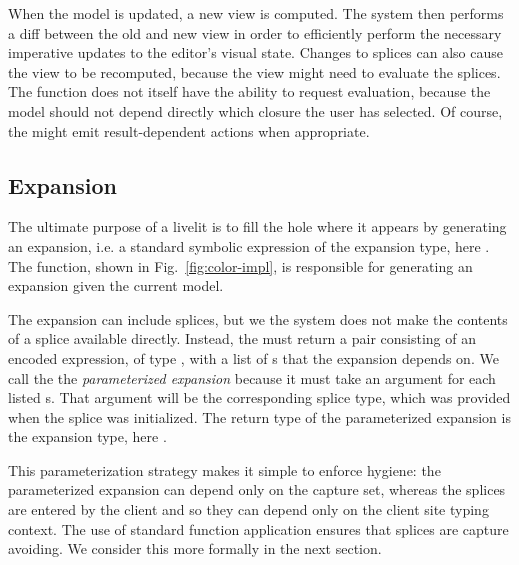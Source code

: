 When the model is updated, a new view is 
computed. The system then performs a diff between the old and new view in order to 
efficiently perform the necessary imperative updates to the editor's visual state.
Changes to splices can also cause the view to be recomputed, because the view might 
need to evaluate the splices. The  function does not itself 
have the ability to request evaluation, because the model should not depend directly  
which closure the user has selected. Of course, the  might emit 
result-dependent actions when appropriate.

\subsection{Expansion}
The ultimate purpose of a livelit is to fill the hole where it appears by generating an expansion,
i.e. a standard symbolic expression of the expansion type, here .
The  function, shown in Fig.~\ref{fig:color-impl}, is responsible for generating 
an expansion given the current model.

The expansion can include splices, but we the system does not make the contents of a splice 
available directly. Instead, the  must return a pair consisting of an encoded expression, of type 
, with a list of s that the expansion depends on. 
We call the  the \emph{parameterized expansion}
 because it must take an argument for each listed s. 
 That argument will be the corresponding splice 
type, which was provided when the splice was initialized. 
 The return type of the parameterized expansion is the expansion type, here .

This parameterization strategy makes it simple to enforce hygiene: the parameterized expansion 
can depend only on the capture set, whereas the splices are entered by the client and so they can 
depend only on the client site typing context. The use of standard function application ensures
that splices are capture avoiding. We consider this more formally in the next section.

